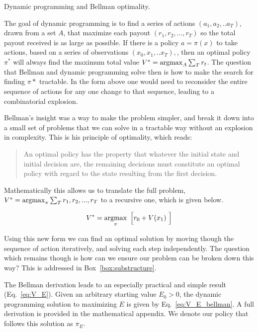 \begin{featurebox}
	\caption{Dynamic programming and Bellman optimality.}
	\label{box:bellman}
	The goal of dynamic programming is to find a series of actions $(a_1, a_2, ..a_T)$, drawn from a set $A$, that maximize each payout $(r_1, r_2, ..., r_{T})$ so the total payout received is as large as possible. If there is a policy $a = \pi(x)$ to take actions, based on a series of observations $(x_0, x_1, ..x_{T}),$, then an optimal policy $\pi^*$ will always find the maximum total value $V^* = \operatorname*{argmax}_{A} \sum_T r_t $. The question that Bellman and dynamic programming solve then is how to make the search for finding $\pi*$ tractable. In the form above one would need to reconsider the entire sequence of actions for any one change to that sequence, leading to a combinatorial explosion. 
	
	Bellman's insight was a way to make the problem simpler, and break it down into a small set of problems that we can solve in a tractable way without an explosion in complexity. This is his principle of optimality, which reads:

	\begin{quote}
		An optimal policy has the property that whatever the initial state and initial decision are, the remaining decisions must constitute an optimal policy with regard to the state resulting from the first decision. \citep{Bellmann1954}
	\end{quote}

	Mathematically this allows us to translate the full problem, $V^* = \operatorname*{argmax}_{\pi} \sum_T r_1, r_2, ..., r_{T}$ to a recursive one, which is given below. 

	\begin{equation}
		V^* = \operatorname*{argmax}_{\pi} \ \Big [ r_0 + V(x_1) \ \Big ]
	\end{equation}
	
	Using this new form we can find an optimal solution by moving though the sequence of action iteratively, and solving each step independently. The question which remains though is how can we ensure our problem can be broken down this way? This is addressed in Box~\ref{box:substructure}.
	\medskip
\end{featurebox}

The Bellman derivation leads to an especially practical and simple result (Eq.~\ref{eq:V_E}). Given an arbitrary starting value $E_0 > 0$, the dynamic programming solution to maximizing $E$ is given by Eq.~\ref{eq:V_E_bellman}. A full derivation is provided in the mathematical appendix. We denote our policy that follows this solution as $\pi_E$.

